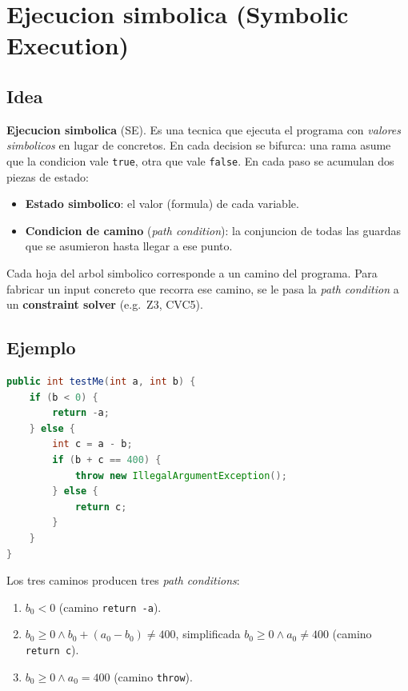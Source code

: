 \documentclass[12pt,a4paper]{article}
\begin{document}
\section{Ejecucion simbolica (Symbolic Execution)}

\subsection{Idea}

\begin{definicionbox}
\textbf{Ejecucion simbolica} (SE). Es una tecnica que ejecuta el programa con \emph{valores
simbolicos} en lugar de concretos. En cada decision se bifurca: una rama asume que la
condicion vale \texttt{true}, otra que vale \texttt{false}. En cada paso se acumulan dos
piezas de estado:
\begin{itemize}
  \item \textbf{Estado simbolico}: el valor (formula) de cada variable.
  \item \textbf{Condicion de camino} (\emph{path condition}): la conjuncion de todas las
  guardas que se asumieron hasta llegar a ese punto.
\end{itemize}
\end{definicionbox}

Cada hoja del arbol simbolico corresponde a un camino del programa. Para fabricar un input
concreto que recorra ese camino, se le pasa la \emph{path condition} a un \textbf{constraint
solver} (e.g.\ Z3, CVC5).

\subsection{Ejemplo}

\begin{lstlisting}[style=codestyle,language=Java]
public int testMe(int a, int b) {
    if (b < 0) {
        return -a;
    } else {
        int c = a - b;
        if (b + c == 400) {
            throw new IllegalArgumentException();
        } else {
            return c;
        }
    }
}
\end{lstlisting}

Los tres caminos producen tres \emph{path conditions}:

\begin{enumerate}
  \item $b_0 < 0$ \quad (camino \texttt{return -a}).
  \item $b_0 \ge 0 \wedge b_0 + (a_0 - b_0) \ne 400$, simplificada $b_0 \ge 0 \wedge a_0 \ne
  400$ \quad (camino \texttt{return c}).
  \item $b_0 \ge 0 \wedge a_0 = 400$ \quad (camino \texttt{throw}).
\end{enumerate}
\end{document}
